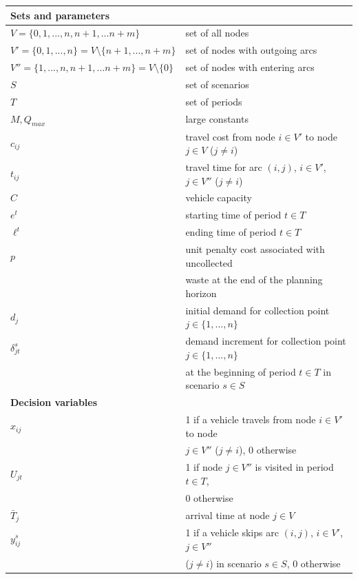 \documentclass[preprint,11pt,authoryear]{elsarticle}
\begin{document}
\begin{table}[h!]
		\centering
		\begin{tabular}{ll}			
\hline
\textbf{Sets and parameters}\\
\hline\vspace{1mm}
			$V=\{0,1,...,n,n+1,...n+m\}$ & set of all nodes\\
			$V'=\{0,1,...,n\}=V\setminus\{n+1,...,n+m\}$  & set of nodes with outgoing arcs\\
			$V''=\{1,...,n,n+1,...n+m\}=V\setminus\{0\}$ & set of nodes with entering arcs\\
			$S$ & set of scenarios \\
            $T$ & set of periods \\
$M, Q_{max} $ & large constants\\ 
			$c_{ij}$ & travel cost from node $i \in V'$ to node $j \in V$ ($j\neq i$)\\
            $t_{ij}$ & travel time for arc $(i,j)$, $i\in V'$, $j\in V''$ ($j \neq i$)\\
			$C$ & vehicle capacity\\
			$e^t$ & starting time of period $t\in T$\\
            $\ell^t$ & ending time of period $t\in T$\\
            $p$ & unit penalty cost associated with uncollected\\ & waste at the end of the planning horizon\\
$d_j$ & initial demand for collection point $j\in\{1,...,n\}$\\
$\delta_{jt}^s$ & demand increment for collection point $j\in\{1,...,n\}$  \\ & at the beginning of period $t\in T$ in scenario $s \in S$\\
\hline
\textbf{Decision variables}\\
\hline
	$x_{ij}$ & 1 if a vehicle travels from node $i \in V'$ to node \\ & $j \in V''$ ($j\neq i$), $0$ otherwise\\
 $U_{jt}$ & 1 if node $j\in V''$ is visited in period $t \in T$,\\ & $0$ otherwise\\
 $\bar{T}_j$ & arrival time at node $j\in V$ \\
 $y_{ij}^s$ & 1 if a vehicle skips arc $(i,j)$, $i\in V'$, $j\in V''$\\ & ($j\neq i$) in scenario $s \in S$, $0$ otherwise\\ 

\end{tabular}
\end{table}
\end{document}
